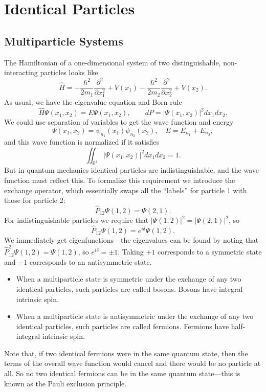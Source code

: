 \documentclass[../p052main.tex]{subfiles}
\begin{document}
\chapter{Identical Particles}
\section{Multiparticle Systems}
The Hamiltonian of a one-dimensional system of two distinguishable, non-interacting particles looks like
\[ \hat H = -\frac{\hbar^2}{2m_1} \frac{\partial^2}{\partial x_1^2} + V(x_1) - \frac{\hbar^2}{2m_2} \frac{\partial^2}{\partial x_2^2} + V(x_2). \]
As usual, we have the eigenvalue equation and Born rule
\[ \hat H \Psi(x_1,x_2) = E \Psi(x_1, x_2), \qquad dP = |\Psi(x_1,x_2)|^2 dx_1dx_2. \]
We could use separation of variables to get the wave function and energy
\[ \Psi(x_1,x_2) = \psi_{n_1}(x_1)\psi_{n_2}(x_2), \quad E = E_{n_1} + E_{n_2}, \]
and this wave function is normalized if it satisfies
\[ \iint_{\mathbb{R}^2} |\Psi(x_1,x_2)|^2 dx_1dx_2 = 1. \]
But in quantum mechanics identical particles are indistinguishable, and the wave function must reflect this.
To formalize this requirement we introduce the exchange operator, which essentially swaps all the ``labels'' for particle 1 with those for particle 2:
\[ \hat P_{12} \Psi(1,2) = \Psi(2,1). \]
For indistinguishable particles we require that $|\Psi(1,2)|^2 = |\Psi(2,1)|^2$, so
\[ \hat P_{12} \Psi(1,2) = e^{i\delta} \Psi(1,2). \]
We immediately get eigenfunctions---the eigenvalues can be found by noting that $\hat P_{12}^2 \Psi(1,2) = \Psi(1,2)$, so $e^{i\delta} = \pm 1$.
Taking $+1$ corresponds to a symmetric state and $-1$ corresponds to an antisymmetric state.
\begin{itemize}
    \item When a multiparticle state is symmetric under the exchange of any two identical particles, such particles are called bosons.
    Bosons have integral intrinsic spin. %
    
    \item When a multiparticle state is antisymmetric under the exchange of any two identical particles, such particles are called fermions.
    Fermions have half-integral intrinsic spin.
\end{itemize}
Note that, if two identical fermions were in the same quantum state, then the terms of the overall wave function would cancel and 
there would be no particle at all.
So no two identical fermions can be in the same quantum state---this is known as the Pauli exclusion principle.
\end{document}
